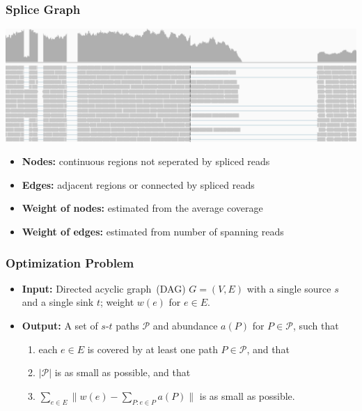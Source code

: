 \frame
{
	\frametitle{Splice Graph}
	\includegraphics[width=\textwidth]{figures/reference.pdf}
	\vspace{0.2cm}
	
	\vspace{-0.4cm}
	
	\vspace{0.2cm}
	\begin{itemize}
	\item<3-> {\bf Nodes:} continuous regions not seperated by spliced reads
	\item<3-> {\bf Edges:} adjacent regions or connected by spliced reads
	\item<4-> {\bf Weight of nodes:} estimated from the average coverage
	\item<4-> {\bf Weight of edges:} estimated from number of spanning reads
	\end{itemize}
}

\frame
{
	\frametitle{Optimization Problem}

	\begin{itemize}
	\item {\bf Input:} Directed acyclic graph~(DAG) $G=(V,E)$ with a single source $s$ and a single sink $t$;
		weight $w(e)$ for $e\in E$.

	\vspace{0.2cm}

	\item {\bf Output:} A set of $s$-$t$ paths $\mathcal{P}$ and abundance $a(P)$ for $P\in\mathcal{P}$, such that
		\begin{enumerate}
		\vspace{0.1cm}
		\item each $e\in E$ is covered by at least one path $P\in\mathcal{P}$, and that
		\vspace{0.1cm}
		\item $|\mathcal{P}|$ is as small as possible, and that
		\vspace{0.1cm}
		\item $\sum_{e\in E} \|w(e) - \sum_{P:e\in P} a(P)\|$ is as small as possible.
		\end{enumerate}
	\end{itemize}

	\vspace{1.0cm}
	
	\vspace{1.0cm}
}


